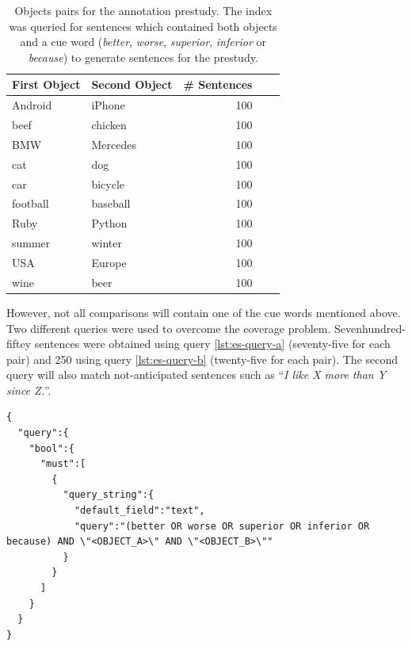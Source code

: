 \begin{table}[h]
\centering
\caption{Objects pairs for the annotation prestudy. The index was queried for sentences which contained both objects and a cue word (\emph{better}, \emph{worse}, \emph{superior}, \emph{inferior} or \emph{because}) to generate sentences for the prestudy.}
\label{tbl:prestudy-objects}
\begin{tabular}{@{}llrrr@{}}
\toprule
First Object & Second Object      & \# Sentences                             \\ \midrule
Android & iPhone    &   100  \\
beef & chicken & 100   \\
BMW    & Mercedes    & 100  \\
cat & dog      &     100  \\ 
car & bicycle & 100 \\
football & baseball   &  100 \\ 
Ruby    & Python    & 100      \\
summer & winter &  100\\
USA & Europe & 100 \\
wine & beer  & 100  \\
\bottomrule  
                               
\end{tabular}
\end{table}

However, not all comparisons will contain one of the cue words mentioned above. Two different queries were used to overcome the coverage problem. Sevenhundred-fiftey sentences were obtained using query \ref{lst:es-query-a} (seventy-five for each pair) and 250 using query \ref{lst:es-query-b} (twenty-five for each pair). The second query will also match not-anticipated sentences such as \enquote{\emph{I like X more than Y since Z.}}.



\begin{lstlisting}[label=lst:es-query-a,breaklines=true,postbreak=\mbox{\textcolor{red}{$\hookrightarrow$}\space},caption=First query used to extract the sentences for the prestudy from the ElasticSearch index. OBJECT\_A and OBJECT\_B are placeholders for the first and second object from the pairs.]
{
  "query":{
    "bool":{
      "must":[
        {
          "query_string":{
            "default_field":"text",
            "query":"(better OR worse OR superior OR inferior OR because) AND \"<OBJECT_A>\" AND \"<OBJECT_B>\""
          }
        }
      ]
    }
  }
}
\end{lstlisting}

